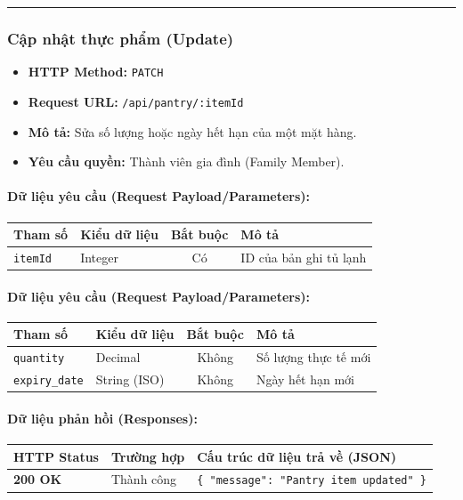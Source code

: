 \documentclass[12pt,a4paper]{article}
\begin{document}
\vskip 0.4cm
\noindent\rule{\textwidth}{0.3pt}
\vskip 0.4cm

\subsubsection{Cập nhật thực phẩm (Update)}
\begin{itemize}[leftmargin=*]
    \item \textbf{HTTP Method:} \texttt{PATCH}
    \item \textbf{Request URL:} \texttt{/api/pantry/:itemId}
    \item \textbf{Mô tả:} Sửa số lượng hoặc ngày hết hạn của một mặt hàng.
    \item \textbf{Yêu cầu quyền:} Thành viên gia đình (Family Member).
\end{itemize}

\paragraph{Dữ liệu yêu cầu (Request Payload/Parameters):}
\begin{longtable}{|>{\raggedright\arraybackslash}p{2.8cm}|>{\raggedright\arraybackslash}p{2.2cm}|c|>{\raggedright\arraybackslash}p{7.0cm}|}
\hline
\textbf{Tham số} & \textbf{Kiểu dữ liệu} & \textbf{Bắt buộc} & \textbf{Mô tả} \\ \hline
\endhead
\texttt{itemId} & Integer & Có & ID của bản ghi tủ lạnh \\ \hline
\end{longtable}

\paragraph{Dữ liệu yêu cầu (Request Payload/Parameters):}
\begin{longtable}{|>{\raggedright\arraybackslash}p{2.8cm}|>{\raggedright\arraybackslash}p{2.2cm}|c|>{\raggedright\arraybackslash}p{7.0cm}|}
\hline
\textbf{Tham số} & \textbf{Kiểu dữ liệu} & \textbf{Bắt buộc} & \textbf{Mô tả} \\ \hline
\endhead
\texttt{quantity} & Decimal & Không & Số lượng thực tế mới \\ \hline
\texttt{expiry\_date} & String (ISO) & Không & Ngày hết hạn mới \\ \hline
\end{longtable}

\paragraph{Dữ liệu phản hồi (Responses):}
\begin{longtable}{|>{\raggedright\arraybackslash}p{2.8cm}|>{\raggedright\arraybackslash}p{3.2cm}|>{\raggedright\arraybackslash}p{8.0cm}|}
\hline
\textbf{HTTP Status} & \textbf{Trường hợp} & \textbf{Cấu trúc dữ liệu trả về (JSON)} \\ \hline
\endhead
\textbf{200 OK} & Thành công & \texttt{\{ "message": "Pantry item updated" \}} \\ \hline
\end{longtable}
\end{document}
